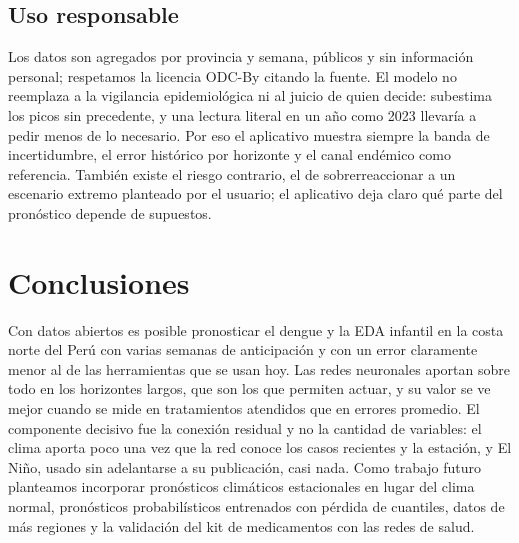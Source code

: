 \documentclass[conference,a4paper]{IEEEtran}
\begin{document}
\subsection{Uso responsable}
Los datos son agregados por provincia y semana, públicos y sin información personal; respetamos la licencia ODC-By citando la fuente. El modelo no reemplaza a la vigilancia epidemiológica ni al juicio de quien decide: subestima los picos sin precedente, y una lectura literal en un año como 2023 llevaría a pedir menos de lo necesario. Por eso el aplicativo muestra siempre la banda de incertidumbre, el error histórico por horizonte y el canal endémico como referencia. También existe el riesgo contrario, el de sobrerreaccionar a un escenario extremo planteado por el usuario; el aplicativo deja claro qué parte del pronóstico depende de supuestos.

\section{Conclusiones}
Con datos abiertos es posible pronosticar el dengue y la EDA infantil en la costa norte del Perú con varias semanas de anticipación y con un error claramente menor al de las herramientas que se usan hoy. Las redes neuronales aportan sobre todo en los horizontes largos, que son los que permiten actuar, y su valor se ve mejor cuando se mide en tratamientos atendidos que en errores promedio. El componente decisivo fue la conexión residual y no la cantidad de variables: el clima aporta poco una vez que la red conoce los casos recientes y la estación, y El Niño, usado sin adelantarse a su publicación, casi nada. Como trabajo futuro planteamos incorporar pronósticos climáticos estacionales en lugar del clima normal, pronósticos probabilísticos entrenados con pérdida de cuantiles, datos de más regiones y la validación del kit de medicamentos con las redes de salud.

\end{document}
